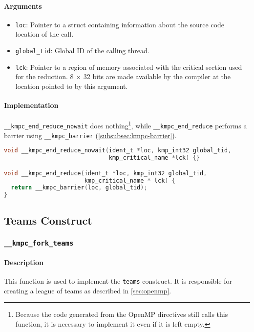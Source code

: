 \paragraph{Arguments}
\begin{itemize}
	\item \texttt{loc}: Pointer to a struct containing information about the source code location
	      of the call.
	\item \texttt{global_tid}: Global ID of the calling thread.
	\item \texttt{lck}: Pointer to a region of memory associated with the critical section used for
	      the reduction. 8 $\times$ 32 bits are made available by the compiler at the location pointed
	      to by this argument.
\end{itemize}

\paragraph{Implementation} \texttt{\_\_kmpc\_end\_reduce\_nowait} does nothing\footnote{Because the
	code generated from the OpenMP directives still calls this function, it is necessary to implement it
	even if it is left empty.}, while \texttt{\_\_kmpc\_end\_reduce} performs a barrier using
\texttt{\_\_kmpc\_barrier} (\cref{subsubsec:kmpc-barrier}).

\begin{lstlisting}[language=C, caption={__kmpc_end_reduce and __kmpc_end_reduce_nowait},
                   label={lst:kmpc-end-reduce}, escapechar=@]
void __kmpc_end_reduce_nowait(ident_t *loc, kmp_int32 global_tid,
                              kmp_critical_name *lck) {}

void __kmpc_end_reduce(ident_t *loc, kmp_int32 global_tid,
                       kmp_critical_name * lck) {
  return __kmpc_barrier(loc, global_tid);
}
\end{lstlisting}

\subsection{Teams Construct}

\subsubsection{\texttt{__kmpc_fork_teams}}
\label{subsubsec:kmpc-fork-teams}

\paragraph{Description} This function is used to implement the \texttt{teams} construct. It is
responsible for creating a league of teams as described in \cref{sec:openmp}.

